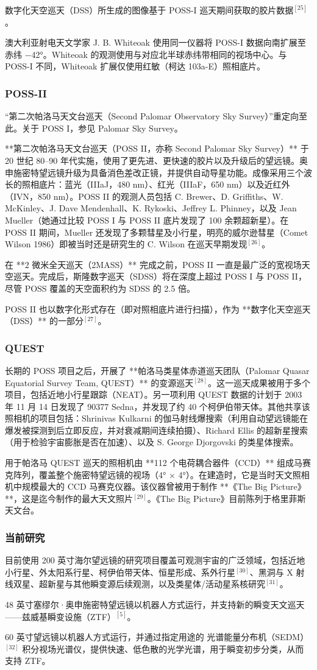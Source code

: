 数字化天空巡天（DSS）所生成的图像基于 POSS-I 巡天期间获取的胶片数据$^{[25]}$。

澳大利亚射电天文学家 J. B. Whiteoak 使用同一仪器将 POSS-I 数据向南扩展至赤纬 −42°。Whiteoak 的观测使用与对应北半球赤纬带相同的视场中心。与 POSS-I 不同，Whiteoak 扩展仅使用红敏（柯达 103a-E）照相底片。
\subsubsection{POSS-II}
“第二次帕洛马天文台巡天（Second Palomar Observatory Sky Survey）”重定向至此。关于 POSS I，参见 Palomar Sky Survey。

**第二次帕洛马天文台巡天（POSS II，亦称 Second Palomar Sky Survey）** 于 20 世纪 80–90 年代实施，使用了更先进、更快速的胶片以及升级后的望远镜。奥申施密特望远镜升级为具备消色差改正镜，并提供自动导星功能。成像采用三个波长的照相底片：蓝光（IIIaJ，480 nm）、红光（IIIaF，650 nm）以及近红外（IVN，850 nm）。POSS II 的观测人员包括 C. Brewer、D. Griffiths、W. McKinley、J. Dave Mendenhall、K. Rykoski、Jeffrey L. Phinney，以及 Jean Mueller（她通过比较 POSS I 与 POSS II 底片发现了 100 余颗超新星）。在 POSS II 期间，Mueller 还发现了多颗彗星及小行星，明亮的威尔逊彗星（Comet Wilson 1986）即被当时还是研究生的 C. Wilson 在巡天早期发现$^{[26]}$。

在 **2 微米全天巡天（2MASS）** 完成之前，POSS II 一直是最广泛的宽视场天空巡天。完成后，斯隆数字巡天（SDSS）将在深度上超过 POSS I 与 POSS II，尽管 POSS 覆盖的天空面积约为 SDSS 的 2.5 倍。

POSS II 也以数字化形式存在（即对照相底片进行扫描），作为 **数字化天空巡天（DSS）** 的一部分$^{[27]}$。
\subsubsection{QUEST}

长期的 POSS 项目之后，开展了 **帕洛马类星体赤道巡天团队（Palomar Quasar Equatorial Survey Team, QUEST）** 的变源巡天$^{[28]}$。这一巡天成果被用于多个项目，包括近地小行星跟踪（NEAT）。另一项利用 QUEST 数据的计划于 2003 年 11 月 14 日发现了 90377 Sedna，并发现了约 40 个柯伊伯带天体。其他共享该照相机的项目包括：Shrinivas Kulkarni 的伽马射线爆搜索（利用自动望远镜能在爆发被探测到后立即反应，并对衰减期间连续拍摄）、Richard Ellis 的超新星搜索（用于检验宇宙膨胀是否在加速）、以及 S. George Djorgovski 的类星体搜索。

用于帕洛马 QUEST 巡天的照相机由 **112 个电荷耦合器件（CCD）** 组成马赛克阵列，覆盖整个施密特望远镜的视场（4° × 4°）。在建造时，它是当时天文照相机中规模最大的 CCD 马赛克仪器。该仪器曾被用于制作 **《The Big Picture》**，这是迄今制作的最大天文照片$^{[29]}$。《The Big Picture》目前陈列于格里菲斯天文台。
\subsubsection{当前研究}
目前使用 200 英寸海尔望远镜的研究项目覆盖可观测宇宙的广泛领域，包括近地小行星、外太阳系行星、柯伊伯带天体、恒星形成、系外行星$^{[30]}$、黑洞与 X 射线双星、超新星与其他瞬变源后续观测，以及类星体/活动星系核研究$^{[31]}$。

48 英寸塞缪尔·奥申施密特望远镜以机器人方式运行，并支持新的瞬变天文巡天——兹威基瞬变设施（ZTF）$^{[5]}$。

60 英寸望远镜以机器人方式运行，并通过指定用途的 光谱能量分布机（SEDM）$^{[32]}$ 积分视场光谱仪，提供快速、低色散的光学光谱，用于瞬变初步分类，从而支持 ZTF。

